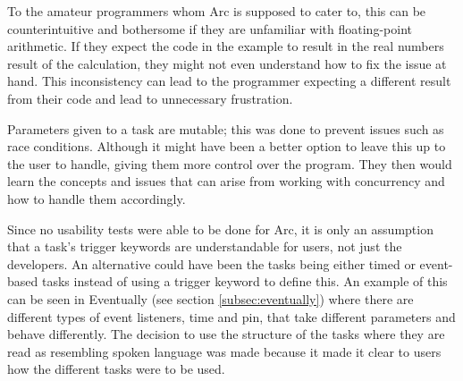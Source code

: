 To the amateur programmers whom Arc is supposed to cater to, this can be counterintuitive and bothersome if they are unfamiliar with floating-point arithmetic. If they expect the code in the example to result in the real numbers result of the calculation, they might not even understand how to fix the issue at hand. This inconsistency can lead to the programmer expecting a different result from their code and lead to unnecessary frustration.




Parameters given to a task are mutable; this was done to prevent issues such as race conditions. Although it might have been a better option to leave this up to the user to handle, giving them more control over the program. They then would learn the concepts and issues that can arise from working with concurrency and how to handle them accordingly.

Since no usability tests were able to be done for Arc, it is only an assumption that a task's trigger keywords are understandable for users, not just the developers. An alternative could have been the tasks being either timed or event-based tasks instead of using a trigger keyword to define this. An example of this can be seen in Eventually (see section \ref{subsec:eventually}) where there are different types of event listeners, time and pin, that take different parameters and behave differently. The decision to use the structure of the tasks where they are read as resembling spoken language was made because it made it clear to users how the different tasks were to be used.





